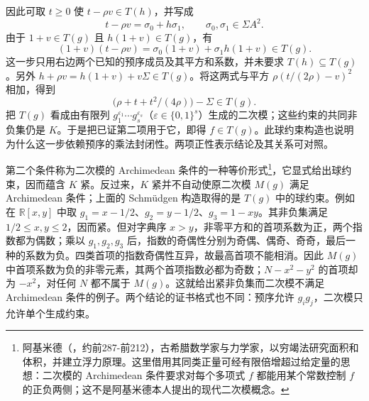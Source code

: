 \begin{proofsketch}
	因此可取 \(t\ge0\) 使 \(t-\rho v\in T(h)\)，并写成
	\[
		t-\rho v=\sigma_0+h\sigma_1, \qquad \sigma_0,\sigma_1\in\Sigma A^2.
	\]
	由于 \(1+v\in T(g)\) 且 \(h(1+v)\in T(g)\)，有
	\[
		(1+v)(t-\rho v) =\sigma_0(1+v)+\sigma_1h(1+v)\in T(g).
	\]
	这一步只用右边两个已知的预序成员及其平方和系数，并未要求 \(T(h)\subseteq T(g)\)。另外 \(h+\rho v=h(1+v)+v\Sigma\in T(g)\)。将这两式与平方 \(\rho(t/(2\rho)-v)^2\) 相加，得到
	\[
		\bigl(\rho+t+t^2/(4\rho)\bigr)-\Sigma\in T(g).
	\]
	把 \(T(g)\) 看成由有限列 \(g_1^{\varepsilon_1}\cdots g_s^{\varepsilon_s}\)（\(\varepsilon\in\{0,1\}^s\)）生成的二次模；这些约束的共同非负集仍是 \(K\)。于是把已证第二项用于它，即得 \(f\in T(g)\)。此球约束构造也说明为什么这一步依赖预序的乘法封闭性。两项正性表示结论及其关系可对照\cite[Section 1, Theorems 1 and 3]{Schweighofer2005Optimization}。
\end{proofsketch}

第二个条件称为二次模的 Archimedean 条件的一种等价形式\footnote{阿基米德（，约前287-前212），古希腊数学家与力学家，以穷竭法研究面积和体积，并建立浮力原理。这里借用其同类正量可经有限倍增超过给定量的思想：二次模的 Archimedean 条件要求对每个多项式 \(f\) 都能用某个常数控制 \(f\) 的正负两侧；这不是阿基米德本人提出的现代二次模概念。}，它显式给出球约束，因而蕴含 \(K\) 紧。反过来，\(K\) 紧并不自动使原二次模 \(M(g)\) 满足 Archimedean 条件；上面的 Schmüdgen 构造取得的是 \(T(g)\) 中的球约束。例如在 \(\mathbb R[x,y]\) 中取 \(g_1=x-1/2\)、\(g_2=y-1/2\)、\(g_3=1-xy\)。其非负集满足 \(1/2\le x,y\le2\)，因而紧。但对字典序 \(x>y\)，非零平方和的首项系数为正，两个指数都为偶数；乘以 \(g_1,g_2,g_3\) 后，指数的奇偶性分别为奇偶、偶奇、奇奇，最后一种的系数为负。四类首项的指数奇偶性互异，故最高首项不能相消。因此 \(M(g)\) 中首项系数为负的非零元素，其两个首项指数必都为奇数；\(N-x^2-y^2\) 的首项却为 \(-x^2\)，对任何 \(N\) 都不属于 \(M(g)\)。这就给出紧非负集而二次模不满足 Archimedean 条件的例子。两个结论的证书格式也不同：预序允许 \(g_ig_j\)，二次模只允许单个生成约束。

\begin{table}[htbp]
	\centering
	\caption{正性证书的假设与形式}
	\label{b3:tab:G-positivity-certificates}
	
\end{table}

